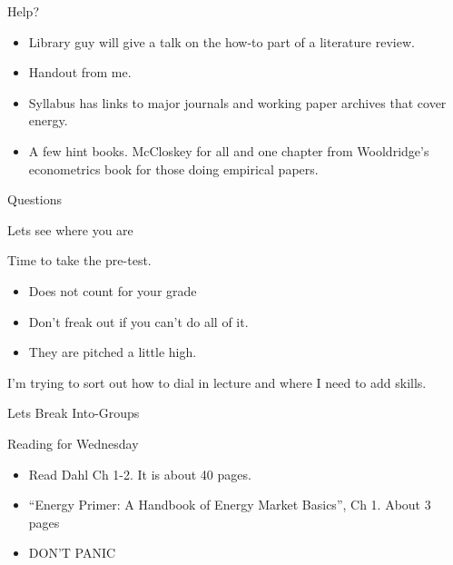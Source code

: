 \documentclass[
  ignorenonframetext,
]{beamer}
\providecommand{\tightlist}{%
  \setlength{\itemsep}{0pt}\setlength{\parskip}{0pt}}
\begin{document}
\begin{frame}{Help?}
\protect\hypertarget{help}{}

\begin{itemize}
\tightlist
\item
  Library guy will give a talk on the how-to part of a literature
  review.
\item
  Handout from me.
\item
  Syllabus has links to major journals and working paper archives that
  cover energy.
\item
  A few hint books. McCloskey for all and one chapter from Wooldridge's
  econometrics book for those doing empirical papers.
\end{itemize}

\end{frame}

\begin{frame}{Questions}
\protect\hypertarget{questions}{}

\end{frame}

\begin{frame}{Lets see where you are}
\protect\hypertarget{lets-see-where-you-are}{}

Time to take the pre-test.

\begin{itemize}
\tightlist
\item
  Does not count for your grade
\item
  Don't freak out if you can't do all of it.
\item
  They are pitched a little high.
\end{itemize}

I'm trying to sort out how to dial in lecture and where I need to add
skills.

\end{frame}

\begin{frame}{Lets Break Into-Groups}
\protect\hypertarget{lets-break-into-groups}{}

\end{frame}

\begin{frame}{Reading for Wednesday}
\protect\hypertarget{reading-for-wednesday}{}

\begin{itemize}
\tightlist
\item
  Read Dahl Ch 1-2. It is about 40 pages.
\item
  ``Energy Primer: A Handbook of Energy Market Basics'', Ch 1. About 3
  pages
\item
  DON'T PANIC
\end{itemize}

\end{frame}
\end{document}
